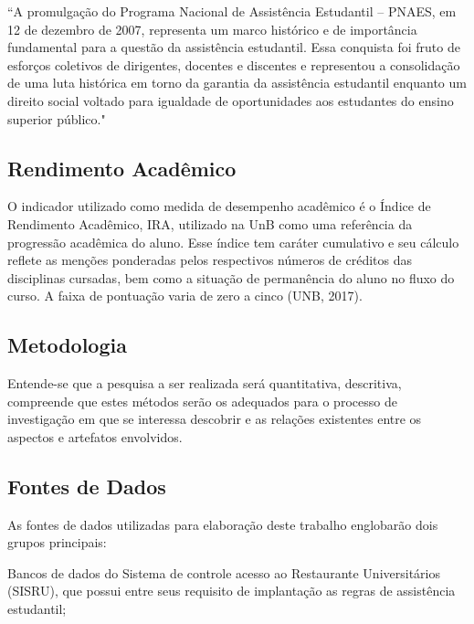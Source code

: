 “A promulgação do Programa Nacional de Assistência Estudantil – PNAES, em 12 de dezembro de 2007, representa um marco histórico e de importância fundamental para a questão da assistência estudantil. Essa conquista foi fruto de esforços coletivos de dirigentes, docentes e discentes e representou a consolidação de uma luta histórica em torno da garantia da assistência estudantil enquanto um direito social voltado para igualdade de oportunidades aos estudantes do ensino superior público."


\subsection{Rendimento Acadêmico}

O indicador utilizado como medida de desempenho acadêmico é o Índice de Rendimento Acadêmico, IRA, utilizado na UnB como uma referência da progressão acadêmica do aluno. Esse índice tem caráter cumulativo e seu cálculo reflete as menções ponderadas pelos respectivos números de créditos das disciplinas cursadas, bem como a situação de permanência do aluno no fluxo do curso. A faixa de pontuação varia de zero a cinco (UNB, 2017).


\subsection{Metodologia}

Entende-se que a pesquisa a ser realizada será quantitativa, descritiva, compreende que estes métodos serão os adequados para o processo de investigação em que se interessa descobrir e as relações existentes entre os aspectos e artefatos envolvidos.


\subsection{Fontes de Dados}

As fontes de dados utilizadas para elaboração deste trabalho englobarão dois grupos principais:

Bancos de dados do Sistema de controle acesso ao Restaurante Universitários (SISRU), que possui entre seus requisito de implantação as regras de assistência estudantil;

